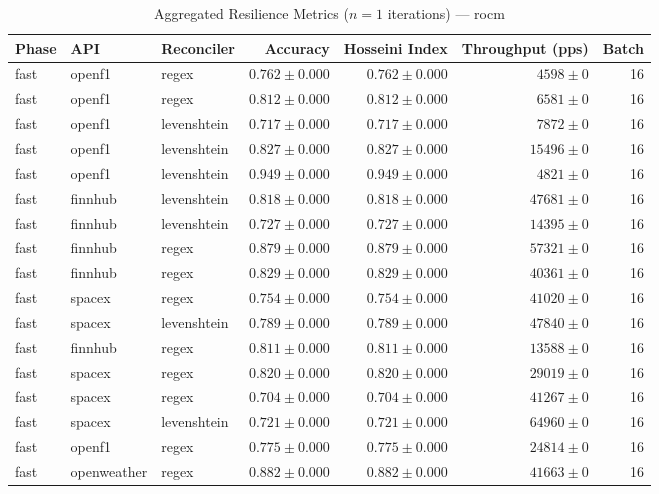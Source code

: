 
\begin{table}[htbp]
\caption{Aggregated Resilience Metrics ($n=1$ iterations) --- rocm}
\begin{tabular}{l l l r r r r}
\hline
Phase & API & Reconciler & Accuracy & Hosseini Index & Throughput (pps) & Batch \\
\hline
fast & openf1 & regex & $0.762\pm0.000$ & $0.762\pm0.000$ & $4598\pm0$ & 16 \\
fast & openf1 & regex & $0.812\pm0.000$ & $0.812\pm0.000$ & $6581\pm0$ & 16 \\
fast & openf1 & levenshtein & $0.717\pm0.000$ & $0.717\pm0.000$ & $7872\pm0$ & 16 \\
fast & openf1 & levenshtein & $0.827\pm0.000$ & $0.827\pm0.000$ & $15496\pm0$ & 16 \\
fast & openf1 & levenshtein & $0.949\pm0.000$ & $0.949\pm0.000$ & $4821\pm0$ & 16 \\
fast & finnhub & levenshtein & $0.818\pm0.000$ & $0.818\pm0.000$ & $47681\pm0$ & 16 \\
fast & finnhub & levenshtein & $0.727\pm0.000$ & $0.727\pm0.000$ & $14395\pm0$ & 16 \\
fast & finnhub & regex & $0.879\pm0.000$ & $0.879\pm0.000$ & $57321\pm0$ & 16 \\
fast & finnhub & regex & $0.829\pm0.000$ & $0.829\pm0.000$ & $40361\pm0$ & 16 \\
fast & spacex & regex & $0.754\pm0.000$ & $0.754\pm0.000$ & $41020\pm0$ & 16 \\
fast & spacex & levenshtein & $0.789\pm0.000$ & $0.789\pm0.000$ & $47840\pm0$ & 16 \\
fast & finnhub & regex & $0.811\pm0.000$ & $0.811\pm0.000$ & $13588\pm0$ & 16 \\
fast & spacex & regex & $0.820\pm0.000$ & $0.820\pm0.000$ & $29019\pm0$ & 16 \\
fast & spacex & regex & $0.704\pm0.000$ & $0.704\pm0.000$ & $41267\pm0$ & 16 \\
fast & spacex & levenshtein & $0.721\pm0.000$ & $0.721\pm0.000$ & $64960\pm0$ & 16 \\
fast & openf1 & regex & $0.775\pm0.000$ & $0.775\pm0.000$ & $24814\pm0$ & 16 \\
fast & openweather & regex & $0.882\pm0.000$ & $0.882\pm0.000$ & $41663\pm0$ & 16 \\

\end{tabular}
\end{table}
